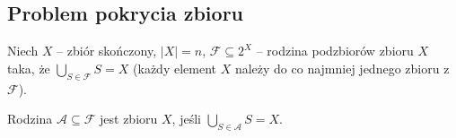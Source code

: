 \subsection{Problem pokrycia zbioru}

\begin{definition}
	Niech $X$ -- zbiór skończony, $|X| = n$, $\mathcal{F} \subseteq 2^X$ -- rodzina podzbiorów zbioru $X$ taka, że $\bigcup_{S \in \mathcal{F}} S = X$ (każdy element $X$ należy do co najmniej jednego zbioru z $\mathcal{F}$).

	Rodzina $\mathcal{A} \subseteq \mathcal{F}$ jest  zbioru $X$, jeśli $\bigcup_{S \in \mathcal{A}} S = X$.
\end{definition}


\newcommand{\Sone}{\textcolor{Scol1}{S_1}}
\newcommand{\Stwo}{\textcolor{Scol2}{S_2}}
\newcommand{\Sthree}{\textcolor{Scol3}{S_3}}
\newcommand{\Sfour}{\textcolor{Scol4}{S_4}}
\newcommand{\Sfive}{\textcolor{Scol5}{S_5}}
\newcommand{\Ssix}{\textcolor{Scol6}{S_6}}

